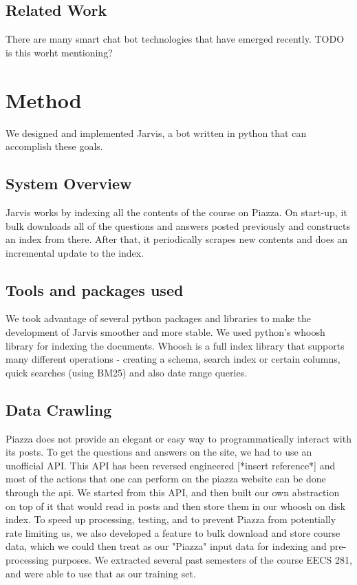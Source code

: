 \documentclass[sigconf]{acmart}
\begin{document}
\subsection{Related Work}
There are many smart chat bot technologies that have emerged recently. TODO is this worht mentioning?

\section{Method}
We designed and implemented Jarvis, a bot written in python that can accomplish these goals. 

\subsection{System Overview}
Jarvis works by indexing all the contents of the course on Piazza. On start-up, it bulk downloads all of the questions and answers posted previously and constructs an index from there. After that, it periodically scrapes new contents and does an incremental update to the index.

\subsection{Tools and packages used}
We took advantage of several python packages and libraries to make the development of Jarvis smoother and more stable. We used python's whoosh library for indexing the documents. Whoosh is a full index library that supports many different operations - creating a schema, search index or certain columns, quick searches (using BM25) and also date range queries. 

\subsection{Data Crawling}
Piazza does not provide an elegant or easy way to programmatically interact with its posts. To get the questions and answers on the site, we had to use an unofficial API. This API has been reversed engineered [*insert reference*] and most of the actions that one can perform on the piazza website can be done through the api. We started from this API, and then built our own abstraction on top of it that would read in posts and then store them in our whoosh on disk index. To speed up processing, testing, and to prevent Piazza from potentially rate limiting us, we also developed a feature to bulk download and store course data, which we could then treat as our "Piazza" input data for indexing and pre-processing purposes. We extracted several past semesters of the course EECS 281, and were able to use that as our training set.
\end{document}
